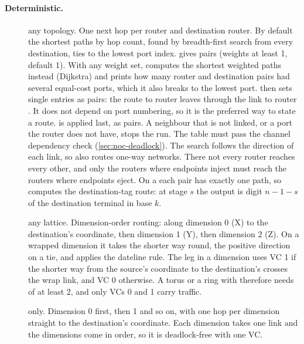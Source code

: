 \paragraph{Deterministic.}
\begin{description}
\item[] any topology. One next hop per router and destination router. By default the
  shortest paths by hop count, found by breadth-first search from every destination, ties to the
  lowest port index.  gives  pairs (weights
  at least 1, default 1). With any weight set,  computes the shortest weighted paths
  instead (Dijkstra) and prints how many router and destination pairs had several equal-cost
  ports, which it also breaks to the lowest port.  then sets single
  entries as  pairs: the route to router  leaves through the link
  to router . It does not depend on port numbering, so it is the preferred way to
  state a route.  is applied last, as  pairs. A
  neighbour that is not linked, or a port the router does not have, stops the run. The table must
  pass the channel dependency check (\cref{sec:noc-deadlock}). The search follows the direction
  of each link, so  also routes one-way networks. There not every router reaches
  every other, and only the routers where endpoints inject must reach the routers where
  endpoints eject. On a  each pair has exactly one path, so  computes
  the destination-tag route: at stage $s$ the output is digit $n-1-s$ of the destination
  terminal in base $k$.
\item[] any lattice. Dimension-order routing: along dimension 0 (X) to the destination's
  coordinate, then dimension 1 (Y), then dimension 2 (Z). On a wrapped dimension it takes the
  shorter way round, the positive direction on a tie, and applies the dateline rule. The leg in a
  dimension uses VC 1 if the shorter way from the source's coordinate to the destination's crosses
  the wrap link, and VC 0 otherwise. A torus or a ring with  therefore needs
   of at least 2, and only VCs 0 and 1 carry traffic.
\item[]  only. Dimension 0 first, then 1 and so on, with one
  hop per dimension straight to the destination's coordinate. Each dimension takes one link and
  the dimensions come in order, so it is deadlock-free with one VC.
\end{description}

